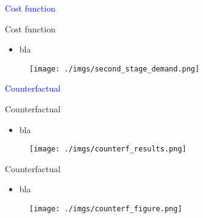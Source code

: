 \documentclass[notes,11pt, aspectratio=169]{beamer}
\begin{document}
\begin{frame}
    \textcolor{blue}{\huge{\centerline{Cost function}}}
\end{frame}

\begin{frame}{Cost function}
    \vspace{0.5cm}
      \begin{itemize}
        \item  bla
      \end{itemize}
      
        \begin{figure}[t*]
          \centering
    
          \texttt{[image: ./imgs/second\_stage\_demand.png]}
        \end{figure}
        
      \end{frame}

\begin{frame}
    \textcolor{blue}{\huge{\centerline{Counterfactual}}}
\end{frame}

\begin{frame}{Counterfactual}
    \vspace{0.5cm}
      \begin{itemize}
        \item  bla
      \end{itemize}
      
        \begin{figure}[t*]
          \centering
    
          \texttt{[image: ./imgs/counterf\_results.png]}
        \end{figure}
        
      \end{frame}

\begin{frame}{Counterfactual}
    \vspace{0.5cm}
      \begin{itemize}
        \item  bla
      \end{itemize}
      
        \begin{figure}[t*]
          \centering
    
          \texttt{[image: ./imgs/counterf\_figure.png]}
        \end{figure}
        
      \end{frame}
\end{document}
